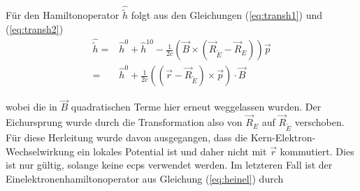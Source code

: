 	Für den Hamiltonoperator $\hat{\tilde{h}}$ folgt aus den Gleichungen (\ref{eq:transh1}) und (\ref{eq:transh2})
	\begin{equation}
	\begin{aligned}
	\hat{\tilde{h}}=&\hat{h}^0+\hat{h}^{10}-\frac{1}{2c}\left(\vec{B}\times\left(\vec{R}_{\tilde{E}}-\vec{R}_E\right)\right)\vec{p}\\
	=&\hat{h}^0+\frac{1}{2c}\left(\left(\vec{r}-\vec{R}_{\tilde{E}}\right)\times\vec{p}\right)\cdot\vec{B}
	\end{aligned}
	\end{equation}
	
	wobei die in $\vec{B}$ quadratischen Terme hier erneut weggelassen wurden. Der Eichursprung wurde durch die Transformation also von $\vec{R}_E$ auf $\vec{R}_{\tilde{E}}$ verschoben. Für diese Herleitung wurde davon ausgegangen, dass die Kern-Elektron-Wechselwirkung ein lokales Potential ist und daher nicht mit $\vec{r}$ kommutiert. Dies ist nur gültig, solange keine \acp{ecp} verwendet werden. Im letzteren Fall ist der Einelektronenhamiltonoperator aus Gleichung (\ref{eq:heinel}) durch
	
